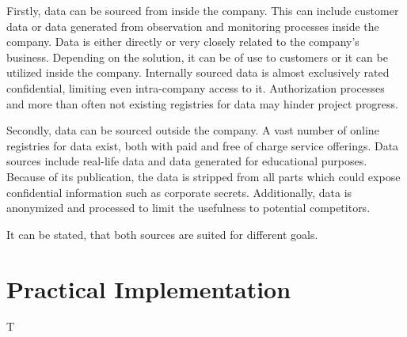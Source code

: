 	Firstly, data can be sourced from inside the company. This can include customer data or data generated from observation and monitoring processes inside the company. Data is either directly or very closely related to the company's business. Depending on the solution, it can be of use to customers or it can be utilized inside the company. Internally sourced data is almost exclusively rated confidential, limiting even intra-company access to it. Authorization processes and more than often not existing registries for data may hinder project progress.
	
	Secondly, data can be sourced outside the company. A vast number of online registries for data exist, both with paid and free of charge service offerings. Data sources include real-life data and data generated for educational purposes. Because of its publication, the data is stripped from all parts which could expose confidential information such as corporate secrets. Additionally, data is anonymized and processed to limit the usefulness to potential competitors.
	
	It can be stated, that both sources are suited for different goals. 

\section{Practical Implementation}
	T